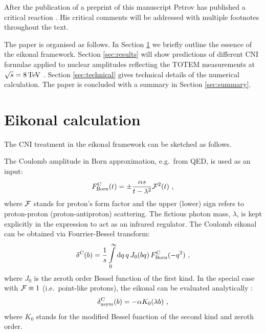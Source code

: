 \documentclass{appolb}
\def\d{{\rm d}}
\def\un#1{\,{\rm #1}}
\begin{document}
After the publication of a preprint of this manuscript \cite{preprint} Petrov has published a critical reaction \cite{petrov2020-2}. His critical comments will be addressed with multiple footnotes throughout the text.

The paper is organised as follows. In Section \ref{sec:eikonal} we briefly outline the essence of the eikonal framework. Section \ref{sec:results} will show predictions of different CNI formulae applied to nuclear amplitudes reflecting the TOTEM measurements at $\sqrt s = 8\un{TeV}$ \cite{totem-8tev-1km}. Section \ref{sec:technical} gives technical details of the numerical calculation. The paper is concluded with a summary in Section \ref{sec:summary}.




\section{Eikonal calculation}
\label{sec:eikonal}

The CNI treatment in the eikonal framework can be sketched as follows.

The Coulomb amplitude in Born approximation, e.g.~from QED, is used as an input:
\begin{equation}
F^{\rm C}_{\rm Born}(t) = \pm {\alpha s\over t - \lambda^2} {\cal F}^2(t)\ ,
\label{eq:F C Born}
\end{equation}
where ${\cal F}$ stands for proton's form factor and the upper (lower) sign refers to proton-proton (proton-antiproton) scattering. The fictious photon mass, $\lambda$, is kept explicitly in the expression to act as an infrared regulator. The Coulomb eikonal can be obtained via Fourrier-Bessel transform:
\begin{equation}
\delta^{\rm C}(b) = {1\over s} \int\limits_0^\infty \d q\, q\, J_0(bq)\, F^{\rm C}_{\rm Born}(-q^2)\ ,
\label{eq:de C}
\end{equation}
where $J_0$ is the zeroth order Bessel function of the first kind. In the special case with ${\cal F} \equiv 1$ (i.e.~point-like protons), the eikonal can be evaluated analytically \cite{cahn82}:
\begin{equation}
\delta^{\rm C}_{\rm asym}(b) = -\alpha K_0(\lambda b)\ ,
\label{eq:de C asym}
\end{equation}
where $K_0$ stands for the modified Bessel function of the second kind and zeroth order.
\end{document}
